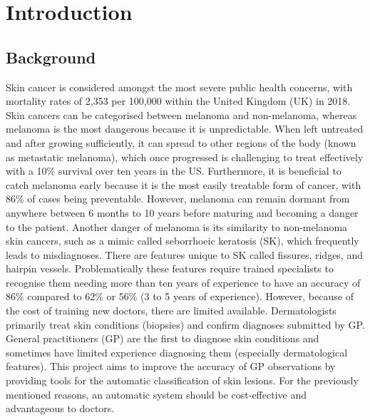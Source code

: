 

\cleardoublepage

\chapter{Introduction}


\section{Background}
Skin cancer is considered amongst the most severe public health concerns, with mortality rates of 2,353 per 100,000 within the United Kingdom (UK) in 2018\cite{UK2019}. Skin cancers can be categorised between melanoma and non-melanoma, whereas melanoma is the most dangerous because it is unpredictable. When left untreated and after growing sufficiently, it can spread to other regions of the body (known as metastatic melanoma), which once progressed is challenging to treat effectively with a 10\% survival over ten years in the US\cite{bhatia2009}. Furthermore, it is beneficial to catch melanoma early because it is the most easily treatable form of cancer, with 86\% of cases being preventable\cite{UK2019}. However, melanoma can remain dormant from anywhere between 6 months to 10 years before maturing and becoming a danger to the patient\cite{UK2019}. Another danger of melanoma is its similarity to non-melanoma skin cancers, such as a mimic called seborrhoeic keratosis (SK), which frequently leads to misdiagnoses\cite{Izikson2002}. There are features unique to SK called fissures, ridges, and hairpin vessels\cite{Minagawa2017}. Problematically these features require trained specialists to recognise them needing more than ten years of experience to have an accuracy of 86\% compared to 62\% or 56\% (3 to 5 years of experience)\cite{Morton1998}. However, because of the cost of training new doctors, there are limited available. Dermatologists primarily treat skin conditions (biopsies) and confirm diagnoses submitted by GP. General practitioners (GP) are the first to diagnose skin conditions and sometimes have limited experience diagnosing them (especially dermatological features). This project aims to improve the accuracy of GP observations by providing tools for the automatic classification of skin lesions. For the previously mentioned reasons, an automatic system should be cost-effective and advantageous to doctors.

